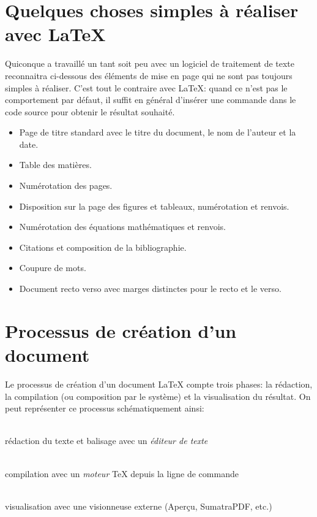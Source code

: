 \section{Quelques choses simples à réaliser avec {\LaTeX}}

Quiconque a travaillé un tant soit peu avec un logiciel de traitement
de texte reconnaitra ci-dessous des éléments de mise en page qui ne
sont pas toujours simples à réaliser. C'est tout le contraire avec
{\LaTeX}: quand ce n'est pas le comportement par défaut, il suffit en
général d'insérer une commande dans le code source pour obtenir le
résultat souhaité.

\begin{itemize}
\item Page de titre standard avec le titre du document, le nom de
  l'auteur et la date.
\item Table des matières.
\item Numérotation des pages.
\item Disposition sur la page des figures et tableaux, numérotation et
  renvois.
\item Numérotation des équations mathématiques et renvois.
\item Citations et composition de la bibliographie.
\item Coupure de mots.
\item Document recto verso avec marges distinctes pour le recto et le
  verso.
\end{itemize}


\section{Processus de création d'un document}
\label{sec:presentation:processus}

Le processus de création d'un document {\LaTeX} compte trois phases:
la rédaction, la compilation (ou composition par le système) et la
visualisation du résultat. On peut représenter ce processus
schématiquement ainsi:
\begin{center}
  \begin{minipage}[t]{0.25\linewidth}
    \centering
    {\Huge\faFile*[regular]} \\ \medskip
    rédaction du texte et balisage avec un \emph{éditeur de texte}
  \end{minipage}
  \quad{\Large\faArrowRight}\quad
  \begin{minipage}[t]{0.25\linewidth}
    \centering
    {\Huge\faCogs} \\ \medskip
    compilation avec un \emph{moteur} {\TeX} depuis la ligne de commande
  \end{minipage}
  \quad{\Large\faArrowRight}\quad
  \begin{minipage}[t]{0.25\linewidth}
    \centering
    {\Huge\faFilePdf[regular]} \\ \medskip
    visualisation avec une visionneuse externe (Aperçu,
    SumatraPDF, etc.)
  \end{minipage}
\end{center}


